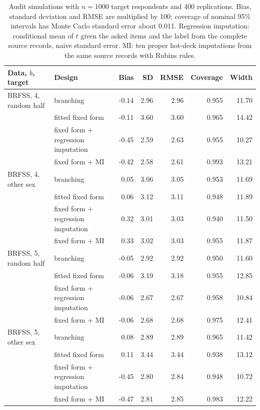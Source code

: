 \begin{table}[h]
\centering
\caption{Audit simulations with $n=1000$ target respondents and 400 replications. Bias, standard deviation and RMSE are multiplied by 100; coverage of nominal 95\% intervals has Monte Carlo standard error about 0.011. Regression imputation: conditional mean of $t$ given the asked items and the label from the complete source records, naive standard error. MI: ten proper hot-deck imputations from the same source records with Rubin\textquotesingle s rules.}
\label{tab:regimp}
\small
\begin{tabular}{llrrrrr}
\toprule
Data, $b$, target & Design & Bias & SD & RMSE & Coverage & Width \\
\midrule
BRFSS, 4, random half & branching & -0.14 & 2.96 & 2.96 & 0.955 & 11.70 \\
 & fitted fixed form & -0.11 & 3.60 & 3.60 & 0.965 & 14.42 \\
 & fixed form + regression imputation & -0.45 & 2.59 & 2.63 & 0.955 & 10.27 \\
 & fixed form + MI & -0.42 & 2.58 & 2.61 & 0.993 & 13.21 \\
BRFSS, 4, other sex & branching & 0.05 & 3.06 & 3.05 & 0.953 & 11.69 \\
 & fitted fixed form & 0.06 & 3.12 & 3.11 & 0.948 & 11.89 \\
 & fixed form + regression imputation & 0.32 & 3.01 & 3.03 & 0.940 & 11.50 \\
 & fixed form + MI & 0.33 & 3.02 & 3.03 & 0.955 & 11.87 \\
BRFSS, 5, random half & branching & -0.05 & 2.92 & 2.92 & 0.950 & 11.60 \\
 & fitted fixed form & -0.06 & 3.19 & 3.18 & 0.955 & 12.85 \\
 & fixed form + regression imputation & -0.06 & 2.67 & 2.67 & 0.958 & 10.84 \\
 & fixed form + MI & -0.06 & 2.68 & 2.68 & 0.975 & 12.41 \\
BRFSS, 5, other sex & branching & 0.08 & 2.89 & 2.89 & 0.965 & 11.42 \\
 & fitted fixed form & 0.11 & 3.44 & 3.44 & 0.938 & 13.12 \\
 & fixed form + regression imputation & -0.45 & 2.80 & 2.84 & 0.948 & 10.72 \\
 & fixed form + MI & -0.47 & 2.81 & 2.85 & 0.983 & 12.22 \\
\bottomrule
\end{tabular}
\end{table}
